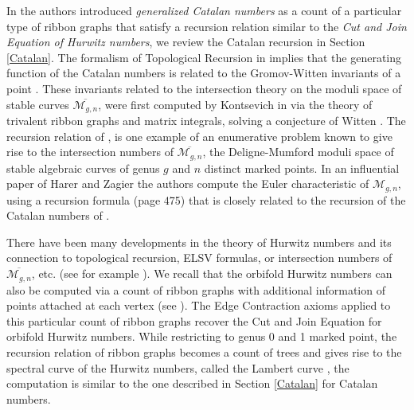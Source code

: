 \documentclass{amsart}
\theoremstyle{definition}
\begin{document}
In \cite{DMSS} the authors introduced {\it generalized Catalan numbers}
as a count of a particular type of ribbon graphs that satisfy a recursion relation similar to the {\it Cut and Join Equation of Hurwitz numbers}, we review the Catalan recursion in Section \ref{Catalan}. The formalism of Topological Recursion in \cite{DMSS} implies that the generating function of the Catalan numbers is related to the Gromov-Witten invariants of a point \cite{W1991}. These invariants related to the intersection theory on the moduli space of stable curves  $\overline{\mathcal{M}_{g,n}}$,  were first computed by Kontsevich in \cite{Kontsevich_intersection} via the theory of trivalent ribbon graphs and matrix integrals, solving a conjecture of Witten \cite{W1991}. The recursion relation of \cite{DMSS},  is one example of an enumerative problem known to give rise to the intersection numbers of $\overline{\mathcal{M}_{g,n}}$, the Deligne-Mumford moduli space of stable algebraic curves of genus $g$ and $n$ distinct marked points. 
 In an influential paper of Harer and Zagier \cite{HZ} the authors compute the Euler characteristic of $\mathcal{M}_{g,n}$, using a recursion formula (page 475) that is closely related to the recursion of the Catalan numbers of \cite{DMSS}.
 
 There have been many developments in the theory of Hurwitz numbers  and its connection to topological recursion, ELSV formulas, or intersection numbers of $\overline{\mathcal{M}_{g,n}}$, etc. (see for example  \cite{Sh,EMS,OP}). We recall that the orbifold Hurwitz numbers can also be computed via a count of ribbon graphs with additional information of points attached at each vertex (see \cite{DM_Hurwitz}). The Edge Contraction axioms applied to this particular count of ribbon graphs recover the Cut and Join Equation for orbifold Hurwitz numbers. While restricting to genus 0 and 1 marked point, the recursion relation of ribbon graphs becomes a count of trees and gives rise to  the spectral curve of the Hurwitz numbers, called the Lambert curve \cite{DM_Hurwitz}, the computation is similar to the one described in Section \ref{Catalan} for Catalan numbers. 

\end{document}
